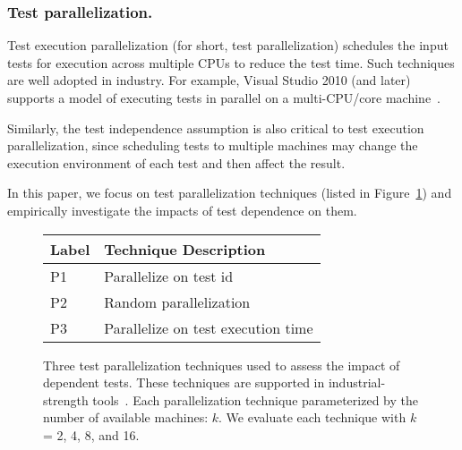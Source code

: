 \subsubsection{Test parallelization.}

Test execution parallelization (for short, test parallelization)
schedules the input tests for execution across
multiple CPUs to reduce the test time.
Such techniques are well adopted in
industry. For example, Visual Studio 2010 (and later)
supports a model of executing tests in parallel on a multi-CPU/core machine~\cite{}.

Similarly, the test independence assumption is also critical to
test execution parallelization, since scheduling tests
to multiple machines may change the execution environment
of each test and then affect the result. 

In this paper, we focus on \parnum test parallelization techniques
(listed in Figure~\ref{tab:testpar}) and empirically investigate
the impacts of test dependence on them.

\begin{figure}
\centering
\setlength{\tabcolsep}{0.25\tabcolsep}
\begin{tabular}{|l|l|}
\hline
\textbf{Label} & \textbf{Technique Description} \\
\hline
P1 & Parallelize on test id\\
P2 & Random parallelization\\
P3 & Parallelize on test execution time\\
\hline
\end{tabular}
\caption{Three test parallelization techniques used
to assess the impact of dependent tests. These
techniques are supported in industrial-strength
tools~\cite{}. 
Each parallelization technique parameterized
by the number of available machines: $k$. We evaluate
each technique with $k$ = 2, 4, 8, and 16.
}
\label{tab:testpar}
\end{figure}

